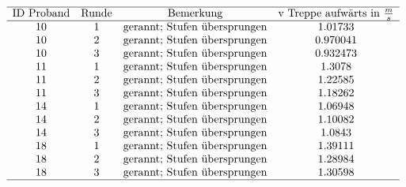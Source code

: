 \[\begin{array}{cccc}
 \hline
 \text{ID Proband} & \text{Runde} & \text{Bemerkung} & \text{v Treppe aufw{\" a}rts in }\frac{m}{s} \\
 \hline
 10 & 1 & \text{gerannt; Stufen {\" u}bersprungen} & 1.01733 \\
 10 & 2 & \text{gerannt; Stufen {\" u}bersprungen} & 0.970041 \\
 10 & 3 & \text{gerannt; Stufen {\" u}bersprungen} & 0.932473 \\
 11 & 1 & \text{gerannt; Stufen {\" u}bersprungen} & 1.3078 \\
 11 & 2 & \text{gerannt; Stufen {\" u}bersprungen} & 1.22585 \\
 11 & 3 & \text{gerannt; Stufen {\" u}bersprungen} & 1.18262 \\
 14 & 1 & \text{gerannt; Stufen {\" u}bersprungen} & 1.06948 \\
 14 & 2 & \text{gerannt; Stufen {\" u}bersprungen} & 1.10082 \\
 14 & 3 & \text{gerannt; Stufen {\" u}bersprungen} & 1.0843 \\
 18 & 1 & \text{gerannt; Stufen {\" u}bersprungen} & 1.39111 \\
 18 & 2 & \text{gerannt; Stufen {\" u}bersprungen} & 1.28984 \\
 18 & 3 & \text{gerannt; Stufen {\" u}bersprungen} & 1.30598 \\
 \hline
\end{array}\]

